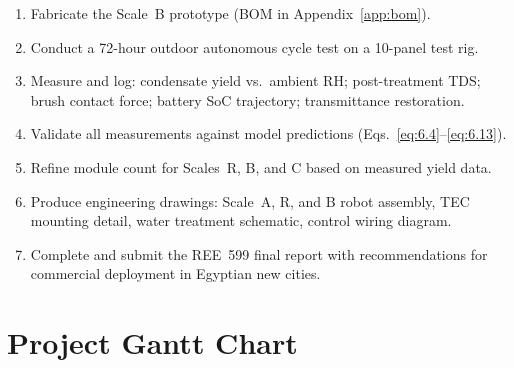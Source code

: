 \documentclass[12pt,a4paper]{report}
\numberwithin{equation}{chapter}
\numberwithin{figure}{chapter}
\numberwithin{table}{chapter}
\begin{document}
\begin{enumerate}[leftmargin=*, label=\textbf{T\arabic*.}]
  \item Fabricate the Scale~B prototype (BOM in Appendix~\ref{app:bom}).
  \item Conduct a 72-hour outdoor autonomous cycle test on a 10-panel test rig.
  \item Measure and log: condensate yield vs.\ ambient RH; post-treatment TDS; brush
        contact force; battery SoC trajectory; transmittance restoration.
  \item Validate all measurements against model predictions
        (Eqs.~\eqref{eq:6.4}--\eqref{eq:6.13}).
  \item Refine module count for Scales~R, B, and C based on measured yield data.
  \item Produce engineering drawings: Scale~A, R, and B robot assembly, TEC mounting
        detail, water treatment schematic, control wiring diagram.
  \item Complete and submit the REE~599 final report with recommendations for
        commercial deployment in Egyptian new cities.
\end{enumerate}

\section{Project Gantt Chart}
\end{document}
